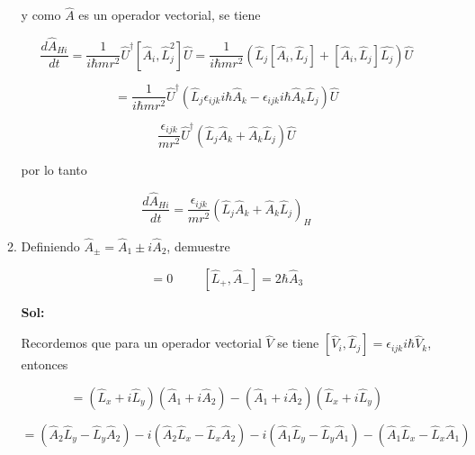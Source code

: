 \documentclass[12pt,a4paper]{article}
\begin{document}
\begin{enumerate}
\begin{enumerate}
    y como $\hat{A}$ es un operador vectorial, se tiene
    
    
    \begin{equation*}
        \frac{d \hat{A}_{Hi}}{d t} = \frac{1}{i \hbar m r^2} \hat{U}^{\dagger} [\hat{A}_{i}, \hat{L}_{j}^{2}] \hat{U} = \frac{1}{i \hbar m r^2} (\hat{L}_{j}[\hat{A}_{i}, \hat{L}_{j}] + [\hat{A}_{i},\hat{L}_{j}]\hat{L_{j}}) \hat{U}
    \end{equation*}
    
    \begin{equation*}
        = \frac{1}{i \hbar m r^2}\hat{U}^{\dagger} (\hat{L}_{j} \epsilon_{ijk} i \hbar \hat{A}_{k} - \epsilon_{ijk} i \hbar \hat{A}_{k} \hat{L}_{j}) \hat{U}
    \end{equation*}
    
    \begin{equation*}
        \frac{\epsilon_{ijk}}{mr^2} \hat{U}^{\dagger} (\hat{L}_{j}\hat{A}_{k} + \hat{A}_{k} \hat{L}_{j}) \hat{U}
    \end{equation*}
    
    por lo tanto
    
    
    \begin{equation*}
        \frac{d \hat{A}_{Hi}}{d t} = \frac{\epsilon_{ijk}}{m r^2} (\hat{L}_{j} \hat{A}_{k} + \hat{A}_{k} \hat{L}_{j})_{H}
    \end{equation*}
    
    
    
    
    \item Definiendo $\hat{A}_{\pm} = \hat{A}_1 \pm i \hat{A}_{2}$, demuestre 
    
    \begin{equation*}
        [\hat{L}_{+}, \hat{A}_{+}] = 0 \hspace{1cm} [\hat{L}_{+}, \hat{A}_{-}] = 2 \hbar \hat{A}_{3}
    \end{equation*}
    
    \textbf{Sol:}
    
    Recordemos que para un operador vectorial $\hat{V}$ se tiene $[\hat{V}_{i}, \hat{L}_{j}] = \epsilon_{ijk}i \hbar \hat{V}_{k}$, entonces
    
    \begin{equation*}
        [\hat{L}_{+}, \hat{A}_{+}] = (\hat{L}_{x} + i \hat{L}_{y})(\hat{A}_{1} + i \hat{A}_{2}) - (\hat{A}_{1} + i \hat{A}_{2})(\hat{L}_{x} + i \hat{L}_{y}) 
    \end{equation*}
    
    \begin{equation*}
        = (\hat{A}_{2}\hat{L}_{y} - \hat{L}_{y} \hat{A}_{2})  - i (\hat{A}_{2}\hat{L}_{x} - \hat{L}_{x}\hat{A}_{2}) - i (\hat{A}_{1} \hat{L}_{y} - \hat{L}_{y}\hat{A}_{1}) - (\hat{A}_{1} \hat{L}_{x} - \hat{L}_{x} \hat{A}_{1})
    \end{equation*}
    

\end{enumerate}
\end{enumerate}
\end{document}
